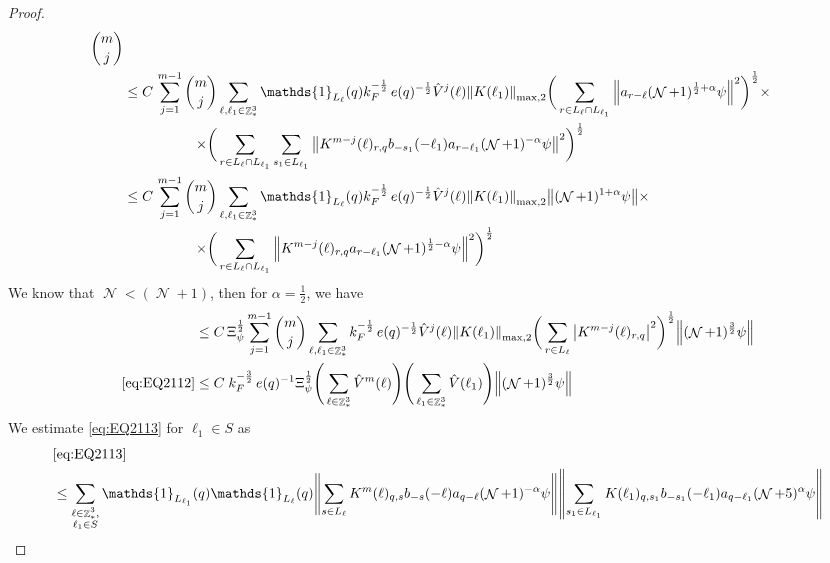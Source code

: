 \documentclass[12pt,a4paper]{article}
\numberwithin{equation}{section}
\newcommand{\1}{\mathbb{I}}
\DeclareMathOperator{\Z}{\mathbb{Z}}
\DeclareMathOperator{\NN}{\mathcal{N}}
\newcommand{\half}{\frac{1}{2}}
\newcommand{\normmaxii}[1]{\norm{#1}_{\mathrm{max,2}}}
\theoremstyle{plain}
\theoremstyle{definition}
\theoremstyle{remark}
\theoremstyle{plain}
\theoremstyle{definition}
\theoremstyle{remark}
\begin{document}
\begin{proof}
\begin{alignat}{2}
\begin{aligned}[t] {{m}\choose j}
		\end{aligned} \nonumber\\   
		&\leq C\, \sum\limits_{j=1}^{m-1} \begin{aligned}[t]{{m}\choose j} &\sum\limits_{\ell,\ell_1 \in \Z^3_*} \mathds{1}_{L_{\ell}}(q) k_F^{-\half}\, e(q)^{-\half} \hat{V}^{j}(\ell) \normmaxii{K(\ell_1)} \bigg( \sum\limits_{r\in L_{\ell} \cap L_{\ell_1}} \norm{ a_{r-\ell} (\NN+1)^{\half+\alpha}\psi}^2\bigg)^\half \times \nonumber\\ \times 
			\bigg( &\sum\limits_{r\in L_{\ell} \cap L_{\ell_1}} \sum\limits_{s_1 \in L_{\ell_1}}\norm{ K^{m-j}(\ell)_{r,q}  b_{-s_1}(-\ell_1)  a_{r-\ell_1} (\NN+1)^{-\alpha}\psi }^2\bigg)^\half
		\end{aligned} \nonumber\\
		&\leq C\, \sum\limits_{j=1}^{m-1} \begin{aligned}[t]{{m}\choose j} &\sum\limits_{\ell,\ell_1 \in \Z^3_*} \mathds{1}_{L_{\ell}}(q)  k_F^{-\half}\, e(q)^{-\half} \hat{V}^{j}(\ell) \normmaxii{K(\ell_1)}  
			\norm{ (\NN+1)^{1+\alpha}\psi} \times \nonumber\\ \times 
			\bigg( &\sum\limits_{r\in L_{\ell}\cap L_{\ell_1}}  \norm{ K^{m-j}(\ell)_{r,q} a_{r-\ell_1} (\NN+1)^{\half-\alpha}\psi }^2\bigg)^\half \end{aligned} \nonumber\\
	\end{alignat}
	We know that $\NN<(\NN+1)$, then for $\alpha = \half$, we have
	\begin{alignat}{2}
		&\leq C\, \Xi_{\psi}^\half\sum\limits_{j=1}^{m-1} {{m}\choose j} \sum\limits_{\ell, \ell_1\in \Z^3_*}  k_F^{-\half}\, e(q)^{-\half} \hat{V}^{j}(\ell)  \normmaxii{K(\ell_1)} \bigg(\sum\limits_{r\in L_\ell}  \abs{ K^{m-j}(\ell)_{r,q} }^2\bigg)^\half \norm{(\NN+1)^\frac{3}{2} \psi}  \nonumber\\
		\eqref{eq:EQ2112}&\leq C\; k_F^{-\frac{3}{2}}\, e(q)^{-1} \Xi_{\psi}^\half \Bigg( \sum\limits_{\ell \in \Z^3_*}  \hat{V}^{m}(\ell) \Bigg) \Bigg(\sum\limits_{ \ell_1\in \Z^3_*} \hat{V}(\ell_1)\Bigg)  \norm{(\NN+1)^{\frac{3}{2}} \psi} \label{eq:estEQ2112}
	\end{alignat} 
	We estimate \eqref{eq:EQ2113} for $\ell_1 \in S$ as
	\begin{align}
		&\eqref{eq:EQ2113}\nonumber\\
		&\leq\sum\limits_{\substack{\ell\in \Z^3_*,\\ \ell_1\in S}} \mathds{1}_{L_{\ell_1}}(q) \mathds{1}_{L_{\ell}}(q)  \norm{ \sum\limits_{s\in L_{\ell}} K^m(\ell)_{q,s} b_{-s}(-\ell) a_{q-\ell}(\NN+1)^{-\alpha}\psi}\norm{ \sum\limits_{s_1 \in L_{\ell_1}} K(\ell_1)_{q,s_1} b_{-s_1}(-\ell_1)a_{q-\ell_1} (\NN+5)^{\alpha} \psi }\nonumber\\

\end{align}
\end{proof}
\end{document}
